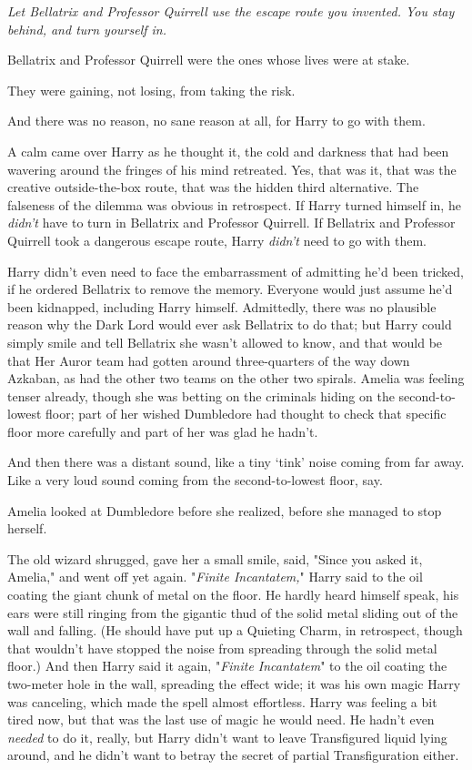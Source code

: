\emph{Let Bellatrix and Professor Quirrell use the escape route you invented.
You stay behind, and turn yourself in.}

Bellatrix and Professor Quirrell were the ones whose lives were at stake.

They were gaining, not losing, from taking the risk.

And there was no reason, no sane reason at all, for Harry to go with them.

A calm came over Harry as he thought it, the cold and darkness that had been
wavering around the fringes of his mind retreated. Yes, that was it, that was
the creative outside-the-box route, that was the hidden third alternative. The
falseness of the dilemma was obvious in retrospect. If Harry turned himself in,
he \emph{didn't} have to turn in Bellatrix and Professor Quirrell. If Bellatrix
and Professor Quirrell took a dangerous escape route, Harry \emph{didn't} need
to go with them.

Harry didn't even need to face the embarrassment of admitting he'd been
tricked, if he ordered Bellatrix to remove the memory. Everyone would just
assume he'd been kidnapped, including Harry himself. Admittedly, there was no
plausible reason why the Dark Lord would ever ask Bellatrix to do that; but
Harry could simply smile and tell Bellatrix she wasn't allowed to know, and
that would be that{\el}
\sbreak
Her Auror team had gotten around three-quarters of the way down Azkaban, as had
the other two teams on the other two spirals. Amelia was feeling tenser
already, though she was betting on the criminals hiding on the second-to-lowest
floor; part of her wished Dumbledore had thought to check that specific floor
more carefully and part of her was glad he hadn't.

And then there was a distant sound, like a tiny `tink' noise coming from far
away. Like a very loud sound coming from the second-to-lowest floor, say.

Amelia looked at Dumbledore before she realized, before she managed to stop
herself.

The old wizard shrugged, gave her a small smile, said, "Since you asked it,
Amelia," and went off yet again.
\sbreak
"\emph{Finite Incantatem,}" Harry said to the oil coating the giant chunk of
metal on the floor. He hardly heard himself speak, his ears were still ringing
from the gigantic thud of the solid metal sliding out of the wall and falling.
(He should have put up a Quieting Charm, in retrospect, though that wouldn't
have stopped the noise from spreading through the solid metal floor.) And then
Harry said it again, "\emph{Finite Incantatem}" to the oil coating the
two-meter hole in the wall, spreading the effect wide; it was his own magic
Harry was canceling, which made the spell almost effortless. Harry was feeling
a bit tired now, but that was the last use of magic he would need. He hadn't
even \emph{needed} to do it, really, but Harry didn't want to leave
Transfigured liquid lying around, and he didn't want to betray the secret of
partial Transfiguration either.


